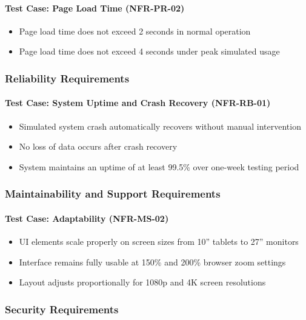 \documentclass[12pt, titlepage]{article}
\begin{document}
\paragraph{Test Case: Page Load Time (NFR-PR-02)}
\begin{itemize}
    \item Page load time does not exceed 2 seconds in normal operation
    \item Page load time does not exceed 4 seconds under peak simulated usage
\end{itemize}

\subsubsection{Reliability Requirements}

\paragraph{Test Case: System Uptime and Crash Recovery (NFR-RB-01)}
\begin{itemize}
    \item Simulated system crash automatically recovers without manual intervention
    \item No loss of data occurs after crash recovery
    \item System maintains an uptime of at least 99.5\% over one-week testing period
\end{itemize}

\subsubsection{Maintainability and Support Requirements}

\paragraph{Test Case: Adaptability (NFR-MS-02)}
\begin{itemize}
    \item UI elements scale properly on screen sizes from 10” tablets to 27” monitors
    \item Interface remains fully usable at 150\% and 200\% browser zoom settings
    \item Layout adjusts proportionally for 1080p and 4K screen resolutions
\end{itemize}

\subsubsection{Security Requirements}
\end{document}
